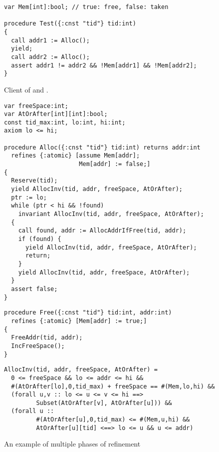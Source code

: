 \begin{figure}
\begin{small}
\begin{verbatim}
var Mem[int]:bool; // true: free, false: taken

procedure Test({:cnst "tid"} tid:int) 
{
  call addr1 := Alloc();
  yield;
  call addr2 := Alloc();
  assert addr1 != addr2 && !Mem[addr1] && !Mem[addr2];
}
\end{verbatim}
\end{small}
\caption{Client of  and .}
\label{fig:refTop}
\end{figure}

\begin{figure}
\begin{small}
\begin{verbatim}
var freeSpace:int;
var AtOrAfter[int][int]:bool; 
const tid_max:int, lo:int, hi:int;
axiom lo <= hi;

procedure Alloc({:cnst "tid"} tid:int) returns addr:int
  refines {:atomic} [assume Mem[addr];  
                     Mem[addr] := false;]
{
  Reserve(tid);
  yield AllocInv(tid, addr, freeSpace, AtOrAfter);         
  ptr := lo;
  while (ptr < hi && !found)
    invariant AllocInv(tid, addr, freeSpace, AtOrAfter);
  { 
    call found, addr := AllocAddrIfFree(tid, addr);
    if (found) {
      yield AllocInv(tid, addr, freeSpace, AtOrAfter);
      return;
    } 
    yield AllocInv(tid, addr, freeSpace, AtOrAfter);
  }
  assert false;
}
\end{verbatim}
\begin{verbatim}
procedure Free({:cnst "tid"} tid:int, addr:int)
  refines {:atomic} [Mem[addr] := true;]
{
  FreeAddr(tid, addr);  
  IncFreeSpace(); 
}
\end{verbatim}
\begin{verbatim}
AllocInv(tid, addr, freeSpace, AtOrAfter) = 
  0 <= freeSpace && lo <= addr <= hi &&
  #(AtOrAfter[lo],0,tid_max) + freeSpace == #(Mem,lo,hi) && 
  (forall u,v :: lo <= u <= v <= hi ==> 
         Subset(AtOrAfter[v], AtOrAfter[u])) &&
  (forall u :: 
         #(AtOrAfter[u],0,tid_max) <= #(Mem,u,hi) &&
         AtOrAfter[u][tid] <==> lo <= u && u <= addr)
\end{verbatim}
\end{small}
\caption{An example of multiple phases of refinement}
\label{fig:refTop}
\end{figure}


